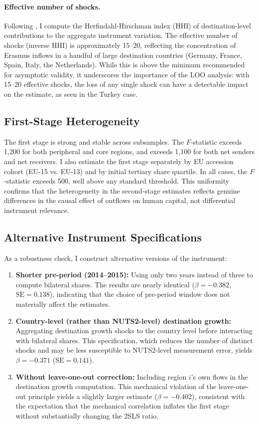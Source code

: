 \documentclass[12pt]{article}
\begin{document}
\paragraph{Effective number of shocks.} Following \citet{borusyak_hull_jaravel_2022}, I compute the Herfindahl-Hirschman index (HHI) of destination-level contributions to the aggregate instrument variation. The effective number of shocks (inverse HHI) is approximately 15--20, reflecting the concentration of Erasmus inflows in a handful of large destination countries (Germany, France, Spain, Italy, the Netherlands). While this is above the minimum recommended for asymptotic validity, it underscores the importance of the LOO analysis: with 15--20 effective shocks, the loss of any single shock can have a detectable impact on the estimate, as seen in the Turkey case.

\subsection{First-Stage Heterogeneity}

The first stage is strong and stable across subsamples. The $F$-statistic exceeds 1,200 for both peripheral and core regions, and exceeds 1,100 for both net senders and net receivers. I also estimate the first stage separately by EU accession cohort (EU-15 vs. EU-13) and by initial tertiary share quartile. In all cases, the $F$-statistic exceeds 500, well above any standard threshold. This uniformity confirms that the heterogeneity in the second-stage estimates reflects genuine differences in the causal effect of outflows on human capital, not differential instrument relevance.

\subsection{Alternative Instrument Specifications}

As a robustness check, I construct alternative versions of the instrument:

\begin{enumerate}
    \item \textbf{Shorter pre-period (2014--2015):} Using only two years instead of three to compute bilateral shares. The results are nearly identical ($\beta = -0.382$, $\text{SE} = 0.138$), indicating that the choice of pre-period window does not materially affect the estimates.
    \item \textbf{Country-level (rather than NUTS2-level) destination growth:} Aggregating destination growth shocks to the country level before interacting with bilateral shares. This specification, which reduces the number of distinct shocks and may be less susceptible to NUTS2-level measurement error, yields $\beta = -0.371$ ($\text{SE} = 0.141$).
    \item \textbf{Without leave-one-out correction:} Including region $i$'s own flows in the destination growth computation. This mechanical violation of the leave-one-out principle yields a slightly larger estimate ($\beta = -0.402$), consistent with the expectation that the mechanical correlation inflates the first stage without substantially changing the 2SLS ratio.
\end{enumerate}
\end{document}

